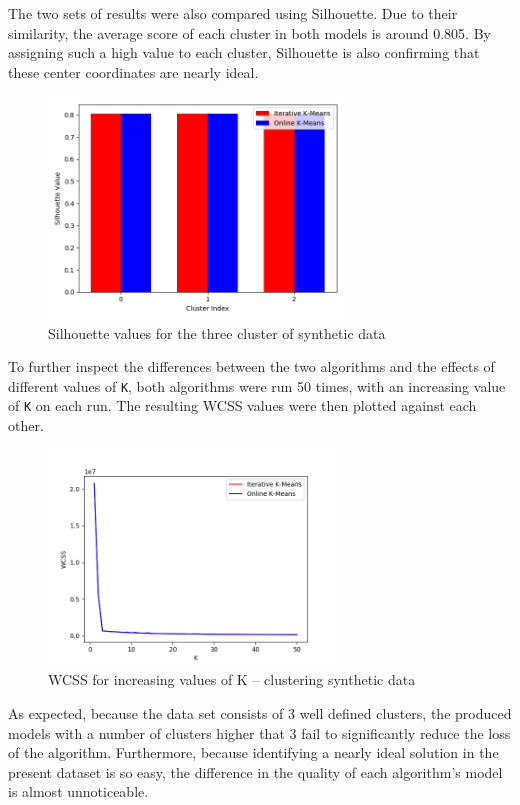 \documentclass{l4proj}
\begin{document}
The two sets of results were also compared using Silhouette. Due to their similarity, the average score of each cluster in both models is around 0.805. By assigning such a high value to each cluster, Silhouette is also confirming that these center coordinates are nearly ideal.

\begin{figure}[H]
	\centering
    \label{fig:res18}
    \includegraphics[width=0.7\textwidth]{images/result18}
    \caption{Silhouette values for the three cluster of synthetic data} 
\end{figure}

To further inspect the differences between the two algorithms and the effects of different values of \texttt{K}, both algorithms were run 50 times, with an increasing value of \texttt{K} on each run. The resulting WCSS values were then plotted against each other.

\begin{figure}[H]
	\centering
    \label{fig:res1}
    \includegraphics[width=0.68\textwidth]{images/result1}
    \caption{WCSS for increasing values of K -- clustering synthetic data} 
\end{figure}

As expected, because the data set consists of 3 well defined clusters, the produced models with a number of clusters higher that 3 fail to significantly reduce the loss of the algorithm. Furthermore, because identifying a nearly ideal solution in the present dataset is so easy, the difference in the quality of each algorithm's model is almost unnoticeable.
\end{document}

